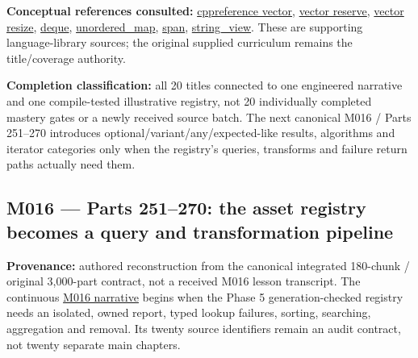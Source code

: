\textbf{Conceptual references consulted:} \href{https://en.cppreference.com/w/cpp/container/vector}{cppreference vector}, \href{https://en.cppreference.com/cpp/container/vector/reserve}{vector reserve}, \href{https://en.cppreference.com/cpp/container/vector/resize}{vector resize}, \href{https://en.cppreference.com/w/cpp/container/deque}{deque}, \href{https://en.cppreference.com/cpp/container/unordered_map}{unordered\_map}, \href{https://en.cppreference.com/w/cpp/container/span}{span}, \href{https://en.cppreference.com/w/cpp/string/basic_string_view}{string\_view}. These are supporting language-library sources; the original supplied curriculum remains the title/coverage authority.

\textbf{Completion classification:} all 20 titles connected to one engineered narrative and one compile-tested illustrative registry, not 20 individually completed mastery gates or a newly received source batch. The next canonical M016 / Parts 251--270 introduces optional/variant/any/expected-like results, algorithms and iterator categories only when the registry's queries, transforms and failure return paths actually need them.

\subsection{M016 --- Parts 251--270: the asset registry becomes a query and transformation pipeline}\label{appendix-fd090d982a15-m016-parts-251270-the-asset-registry-becomes-a-query-and-transformation-pipeline}

\hypertarget{appendix-fd090d982a15-m016-parts-251270-the-asset-registry-becomes-a-query-and-transformation-pipeline}{}

\textbf{Provenance:} authored reconstruction from the canonical integrated 180-chunk / original 3,000-part contract, not a received M016 lesson transcript. The continuous \hyperref[01-foundations-i-ch006-from-a-living-asset-registry-to-reliable-queries-and-transformations]{M016 narrative} begins when the Phase 5 generation-checked registry needs an isolated, owned report, typed lookup failures, sorting, searching, aggregation and removal. Its twenty source identifiers remain an audit contract, not twenty separate main chapters.

